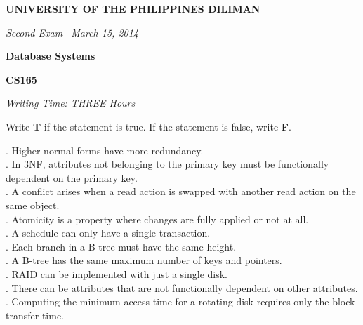 \documentclass[a4paper,12pt,leqno]{article}
\newcommand{\institution}{UNIVERSITY OF THE PHILIPPINES DILIMAN}
\newcommand{\titlehd}{Database Systems}
\newcommand{\examtype}{Second Exam}
\newcommand{\examdate}{March 15, 2014}
\newcommand{\examcode}{CS165}
\newcommand{\writetime}{THREE Hours}
\begin{document}

\begin{center}
\large\textbf{\institution}
\end{center}
\vspace{1cm}

\begin{center}
\textit{ \examtype -- \examdate}
\end{center}
\vspace{1cm}

\begin{center}
\large\textbf{\titlehd}
\end{center}

\begin{center}
\large\textbf{\examcode}
\end{center}
\vspace{4cm}

\begin{center}
\textit{Writing Time:  \writetime}
\end{center}


\newpage
{}
\noindent Write {\textbf T} if the statement is true. If the statement is false, write {\textbf F}.

. Higher normal forms have more redundancy. \\
. In 3NF, attributes not belonging to the primary key must be functionally dependent on the primary key. \\
. A conflict arises when a read action is swapped with another read action on the same object. \\
. Atomicity is a property where changes are fully applied or not at all. \\
. A schedule can only have a single transaction. \\
. Each branch in a B-tree must have the same height. \\
. A B-tree has the same maximum number of keys and pointers. \\
. RAID can be implemented with just a single disk. \\
. There can be attributes that are not functionally dependent on other attributes. \\
. Computing the minimum access time for a rotating disk requires only the block transfer time. 
\end{document}
